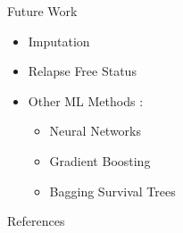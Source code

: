 \documentclass{beamer}
\begin{document}
\begin{frame}{Future Work}
\begin{itemize}
    \item Imputation
    \item Relapse Free Status
	\item Other ML Methods \cite{WangEtAl}:
\begin{itemize}
    \item Neural Networks
    \item Gradient Boosting
	\item Bagging Survival Trees
\end{itemize}
\end{itemize}
\end{frame}


\begin{frame}[allowframebreaks]{References}
    
    
\end{frame}
\end{document}
